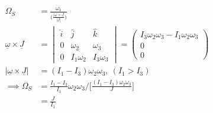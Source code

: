 \documentclass[a4paper,11pt,normalem]{article}
\begin{document}
\begin{example}
\[
    \begin{aligned}
    \Omega_S &= \frac{\dot{\omega}_1}{\Big(\frac{|\underline{\omega} \times \underline{J}}{|\underline{J}|} \Big)} \\
    \underline{\omega} \times \underline{J} &= \begin{vmatrix} \hat{i} & \hat{j} & \hat{k} \\ 0 & \omega_2 & \omega_3 \\ 0 & I_1\omega_2 & I_3\omega_3 \end{vmatrix} = \begin{pmatrix} I_3\omega_2\omega_3 - I_1\omega_2\omega_3 \\ 0 \\ 0 \end{pmatrix} \\
    |\underline{\omega} \times \underline{J}| &= (I_1 - I_3)\omega_2\omega_3,~ (I_1 > I_3) \\
    \implies \Omega_S &= \frac{I_1 - I_3}{I_1}\omega_2\omega_3 \Bigg/ \Bigg[\frac{(I_1 - I_3)\omega_2\omega_3}{J}\Bigg] \\
    &= \frac{J}{I_1}
    \end{aligned}
\]
\end{example}
\end{document}
